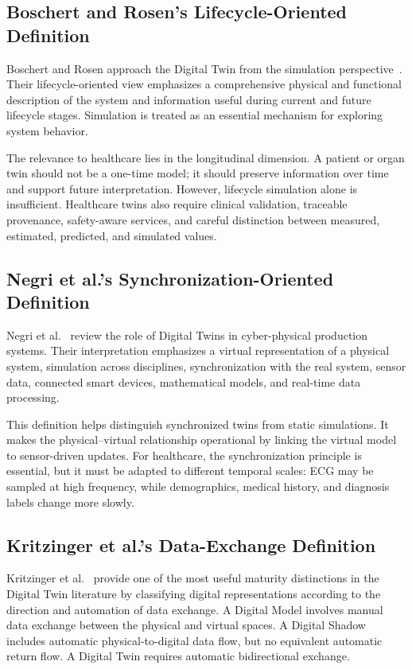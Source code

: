 \subsection{Boschert and Rosen's Lifecycle-Oriented Definition}
Boschert and Rosen approach the Digital Twin from the simulation perspective~\cite{boschert2016digital}. Their lifecycle-oriented view emphasizes a comprehensive physical and functional description of the system and information useful during current and future lifecycle stages. Simulation is treated as an essential mechanism for exploring system behavior.

The relevance to healthcare lies in the longitudinal dimension. A patient or organ twin should not be a one-time model; it should preserve information over time and support future interpretation. However, lifecycle simulation alone is insufficient. Healthcare twins also require clinical validation, traceable provenance, safety-aware services, and careful distinction between measured, estimated, predicted, and simulated values.

\subsection{Negri et al.'s Synchronization-Oriented Definition}
Negri et al.~\cite{negri2017review} review the role of Digital Twins in cyber-physical production systems. Their interpretation emphasizes a virtual representation of a physical system, simulation across disciplines, synchronization with the real system, sensor data, connected smart devices, mathematical models, and real-time data processing.

This definition helps distinguish synchronized twins from static simulations. It makes the physical--virtual relationship operational by linking the virtual model to sensor-driven updates. For healthcare, the synchronization principle is essential, but it must be adapted to different temporal scales: ECG may be sampled at high frequency, while demographics, medical history, and diagnosis labels change more slowly.

\subsection{Kritzinger et al.'s Data-Exchange Definition}
Kritzinger et al.~\cite{kritzinger2018digital} provide one of the most useful maturity distinctions in the Digital Twin literature by classifying digital representations according to the direction and automation of data exchange. A Digital Model involves manual data exchange between the physical and virtual spaces. A Digital Shadow includes automatic physical-to-digital data flow, but no equivalent automatic return flow. A Digital Twin requires automatic bidirectional exchange.

